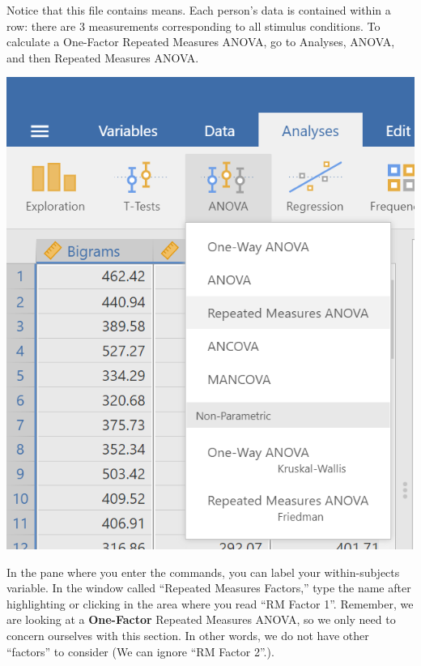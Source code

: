 \documentclass[
]{book}
\begin{document}
Notice that this file contains means. Each person's data is contained within a row: there are 3 measurements corresponding to all stimulus conditions. To calculate a One-Factor Repeated Measures ANOVA, go to {Analyses}, {ANOVA}, and then {Repeated Measures ANOVA}.

\includegraphics{img/RM_ANOVACommands.png}

In the pane where you enter the commands, you can label your within-subjects variable. In the window called ``Repeated Measures Factors,'' type the name after highlighting or clicking in the area where you read ``RM Factor 1''. Remember, we are looking at a \textbf{One-Factor} Repeated Measures ANOVA, so we only need to concern ourselves with this section. In other words, we do not have other ``factors'' to consider (We can ignore ``RM Factor 2''.).
\end{document}
